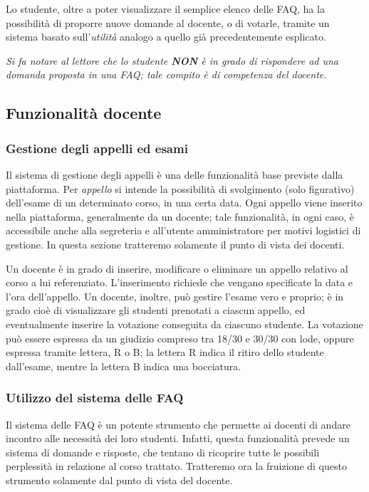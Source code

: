 \documentclass [a4paper,11pt]{book}
\begin{document}
Lo studente, oltre a poter visualizzare il semplice elenco delle FAQ, ha la possibilità di proporre nuove domande al docente, o di votarle, tramite un sistema basato sull'\emph{utilità} analogo a quello già precedentemente esplicato. 

\emph{Si fa notare al lettore che lo studente \textbf{NON} è in grado di rispondere ad una domanda proposta in una FAQ; tale compito è di competenza del docente.}

\medskip

\subsection{Funzionalità docente}

\subsubsection{Gestione degli appelli ed esami}
\label{sec:verb}

Il sistema di gestione degli appelli è una delle funzionalità base previste dalla piattaforma. Per \emph{appello} si intende la possibilità di svolgimento (solo figurativo) dell'esame di un determinato corso, in una certa data. Ogni appello viene inserito nella piattaforma, generalmente da un docente; tale funzionalità, in ogni caso, è accessibile anche alla segreteria e all'utente amministratore per motivi logistici di gestione. In questa sezione tratteremo solamente il punto di vista dei docenti.

Un docente è in grado di inserire, modificare o eliminare un appello relativo al corso a lui referenziato. L'inserimento richiede che vengano specificate la data e l'ora dell'appello. Un docente, inoltre, può gestire l'esame vero e proprio; è in grado cioè di visualizzare gli studenti prenotati a ciascun appello, ed eventualmente inserire la votazione conseguita da ciascuno studente. La votazione può essere espressa da un giudizio compreso tra 18/30 e 30/30 con lode, oppure espressa tramite lettera, R o B; la lettera R indica il ritiro dello studente dall'esame, mentre la lettera B indica una bocciatura.

\medskip

\subsubsection{Utilizzo del sistema delle FAQ}

Il sistema delle FAQ è un potente strumento che permette ai docenti di andare incontro alle necessità dei loro studenti. Infatti, questa funzionalità prevede un sistema di domande e risposte, che tentano di ricoprire tutte le possibili perplessità in relazione al corso trattato. Tratteremo ora la fruizione di questo strumento solamente dal punto di vista del docente.
\end{document}
